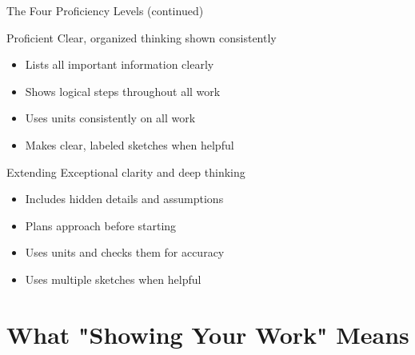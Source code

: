 \documentclass{beamer}
\begin{document}
\begin{frame}{The Four Proficiency Levels (continued)}
\begin{block}{Proficient}
\textcolor{ds9blue}{Clear, organized thinking shown consistently}
\begin{itemize}
\item Lists all important information clearly \pause
\item Shows logical steps throughout all work \pause
\item Uses units consistently on all work \pause
\item Makes clear, labeled sketches when helpful
\end{itemize}
\end{block}

\pause
\begin{block}{Extending}
\textcolor{ds9blue}{Exceptional clarity and deep thinking}
\begin{itemize}
\item Includes hidden details and assumptions \pause
\item Plans approach before starting \pause
\item Uses units and checks them for accuracy \pause
\item Uses multiple sketches when helpful
\end{itemize}
\end{block}
\end{frame}



\section{What "Showing Your Work" Means}
\end{document}
